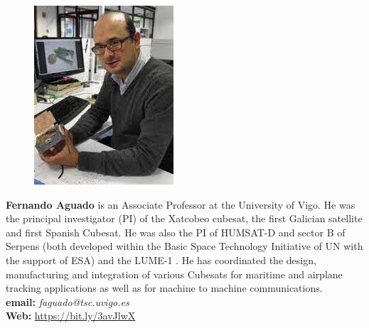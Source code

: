 \documentclass[12pt]{article}
\begin{document}
\parbox{6.25in}{
\begin{figure}
  \centering
  \includegraphics[width=.75\linewidth]{fig/FAguado.jpg}
\end{figure}
\textbf{Fernando Aguado} is an Associate Professor at the University
of Vigo. He was the principal investigator (PI) of the Xatcobeo
cubesat, the first Galician satellite and first Spanish Cubesat. He
was also the PI of HUMSAT-D and sector B of Serpens (both developed
within the Basic Space Technology Initiative of UN with the support of
ESA) and the LUME-1 \smle. He has coordinated the design, manufacturing
and integration of various Cubesats for maritime and airplane tracking
applications as well as for machine to machine communications.
\\
\textbf{email: }\emph{faguado@tsc.uvigo.es} \\
\textbf{Web: }\url{https://bit.ly/3avJlwX}\\
}

\vspace*{+0.1in}
\end{document}
